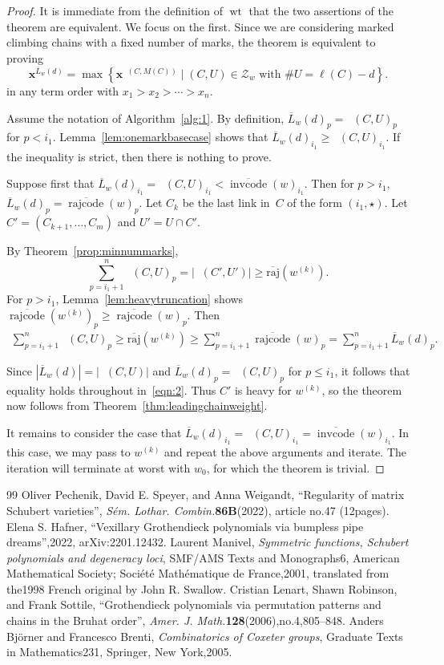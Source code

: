 \documentclass[10pt,a4paper]{amsart}
\newcommand{\absoverrajcode}[1]{\overline{\mathrm{raj}}(#1)}
\DeclareMathOperator{\wt}{\mathrm{wt}}
\DeclareMathOperator{\dwt}{\overline{\mathrm{wt}}}
\DeclareMathOperator{\cc}{\mathrm{invcode}}
\newcommand{\occ}{\overline{\cc}}
\DeclareMathOperator{\rr}{\mathrm{rajcode}}
\newcommand{\orr}{\overline{\rr}}
\newcommand{\LL}{\overline{L}}
\begin{document}
\begin{proof}
	It is immediate from the definition of $\wt$ that the two assertions of the theorem are equivalent. We focus on the first. Since we are considering marked climbing chains with a fixed number of marks, the theorem is equivalent to proving
	\[\bm{x}^{\LL_w(d)} = \max \left\{\bm{x}^{\dwt(C,M(C))} \mid (C,U)\in \mathcal{Z}_w \mbox{ with } \#U = 
	\ell(C) - d \right\}. \] 
	in any term order with $x_1>x_2>\cdots>x_n$. 
	
	Assume the notation of Algorithm~\ref{alg:1}. 
	By definition, $\LL_w(d)_{p}=\dwt(C,U)_{p}$ for $p<i_1$. Lemma~\ref{lem:onemarkbasecase} shows that $\LL_w(d)_{i_1}\geq\dwt(C,U)_{i_1}$. If the inequality is strict, then there is nothing to prove. 
	
	Suppose first that $\LL_w(d)_{i_1}=\dwt(C,U)_{i_1}<\occ(w)_{i_1}$. Then for $p>i_1$, $\LL_w(d)_p=\orr(w)_p$. 
	Let $C_k$ be the last link in~$C$ of the form $(i_1,\star)$. Let $C'=(C_{k+1},\ldots,C_m)$ and $U'=U\cap C'$.
	
	By Theorem~\ref{prop:minnummarks},
	\[\sum_{p=i_1+1}^n \dwt(C,U)_p = |\dwt(C',U')|\geq \absoverrajcode{w^{(k)}}. \]
	For $p>i_1$, Lemma~\ref{lem:heavytruncation} shows $\orr(w^{(k)})_p\geq \orr(w)_p$. Then
	\begin{align}
		\label{eqn:2}
		\sum_{p=i_1+1}^n \dwt(C,U)_p \geq \absoverrajcode{w^{(k)}}\geq \sum_{p=i_1+1}^n\orr(w)_p = \sum_{p=i_1+1}^n\LL_w(d)_p.
	\end{align}
	
	Since $|\LL_w(d)| = |\dwt(C,U)|$ and $\LL_w(d)_p = \dwt(C,U)_p$ for $p\leq i_1$, it follows that equality holds throughout in~\eqref{eqn:2}. Thus $C'$ is heavy for $w^{(k)}$, so the theorem now follows from Theorem~\ref{thm:leadingchainweight}.
	
	It remains to consider the case that $\LL_w(d)_{i_1}=\dwt(C,U)_{i_1}=\occ(w)_{i_1}$. In this case, we may pass to $w^{(k)}$ and repeat the above arguments and iterate. The iteration will terminate at worst with $w_0$, for which the theorem is trivial.
\end{proof}

\begin{thebibliography}{99}
 Oliver Pechenik, David E. Speyer, and Anna Weigandt, ``Regularity of matrix Schubert varieties'', \emph{S\'em. Lothar. Combin.}\textbf{86B}(2022), article no.47 (12pages).
 Elena S. Hafner, ``Vexillary Grothendieck polynomials via bumpless pipe dreams'',2022, arXiv:2201.12432.
 Laurent Manivel, \emph{Symmetric functions, Schubert polynomials and degeneracy loci}, SMF/AMS Texts and Monographs6, American Mathematical Society; Soci\'et\'e Math\'ematique de France,2001, translated from the1998 French original by John R. Swallow.
 Cristian Lenart, Shawn Robinson, and Frank Sottile, ``Grothendieck polynomials via permutation patterns and chains in the Bruhat order'', \emph{Amer. J. Math.}\textbf{128}(2006),no.4,805--848.
 Anders Bj\"orner and Francesco Brenti, \emph{Combinatorics of Coxeter groups}, Graduate Texts in Mathematics231, Springer, New York,2005.
\end{thebibliography}
\end{document}
